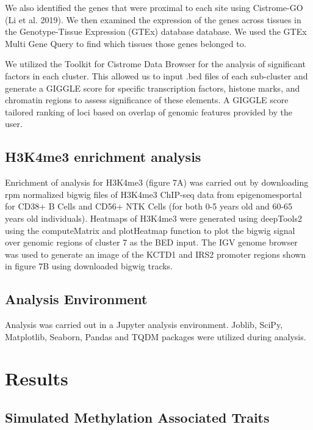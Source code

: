 \documentclass[sn-nature]{sn-jnl}
\begin{document}
{\begin{linenumbers}
We also identified the genes that were proximal to each site using Cistrome-GO (Li et al. 2019). We then 
examined the expression of the genes across tissues in the Genotype-Tissue Expression (GTEx) database database. 
We used the GTEx Multi Gene Query to find which tissues those genes belonged to. 

We utilized the Toolkit for Cistrome Data Browser \cite{Zheng2019-vm,Mei2017-yq} for the analysis of significant factors in each cluster. This allowed 
us to input .bed files of each sub-cluster and generate a GIGGLE score for specific transcription factors, histone marks, 
and chromatin regions to assess significance of these elements. A GIGGLE score tailored ranking of loci based on overlap 
of genomic features provided by the user\cite{Layer2018-gr}.


\subsection{H3K4me3 enrichment analysis} 
Enrichment of analysis for H3K4me3 (figure 7A) was carried out by downloading rpm normalized bigwig files of H3K4me3 ChIP-seq data from 
epigenomesportal\cite{Bujold2016-vk} for CD38+ B Cells and CD56+ NTK Cells (for both 0-5 years old and 60-65 years old individuals). 
Heatmaps of H3K4me3 were generated using deepTools2\cite{Ramirez2016-xl} using the computeMatrix and plotHeatmap function to plot the 
bigwig signal over genomic regions of cluster 7 as the BED input. The IGV genome browser\cite{Robinson2011-he} was used to generate an image of the KCTD1 
and IRS2 promoter regions shown in figure 7B using downloaded bigwig tracks.


\subsection{Analysis Environment}
Analysis was carried out in a Jupyter\cite{Basu_undated-vq} analysis environment. 
Joblib\cite{Varoquaux2009-al}, SciPy\cite{Virtanen2020-wt}, Matplotlib\cite{Hunter2007-nq}, 
Seaborn\cite{Waskom2021-gj}, Pandas\cite{McKinney2012-ta} and TQDM\cite{Da_Costa-Luis2019-lr} 
packages were utilized during analysis. 



\section{Results}\label{sec3}

\subsection{Simulated Methylation Associated Traits}


\end{linenumbers}}
\end{document}
